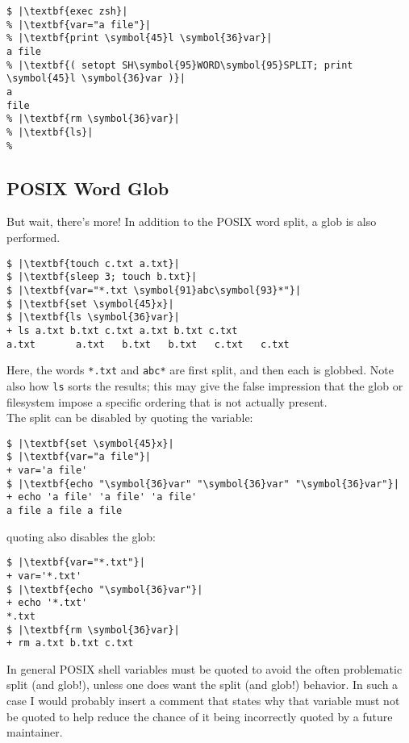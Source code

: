 \documentclass[10pt,a4paper]{article}
\begin{document}
\begin{lstlisting}
$ |\textbf{exec zsh}|
% |\textbf{var="a file"}|
% |\textbf{print \symbol{45}l \symbol{36}var}|
a file
% |\textbf{( setopt SH\symbol{95}WORD\symbol{95}SPLIT; print \symbol{45}l \symbol{36}var )}|
a
file
% |\textbf{rm \symbol{36}var}|
% |\textbf{ls}|
%
\end{lstlisting}

\subsection*{POSIX Word Glob}

But wait, there's more! In addition to the POSIX word split, a glob is
also performed.

\begin{lstlisting}
$ |\textbf{touch c.txt a.txt}|
$ |\textbf{sleep 3; touch b.txt}|
$ |\textbf{var="*.txt \symbol{91}abc\symbol{93}*"}|
$ |\textbf{set \symbol{45}x}|
$ |\textbf{ls \symbol{36}var}|
+ ls a.txt b.txt c.txt a.txt b.txt c.txt
a.txt       a.txt   b.txt   b.txt   c.txt   c.txt
\end{lstlisting}

Here, the words \texttt{*.txt} and \texttt{abc*}
are first split, and then each is globbed. Note also how \texttt{ls}
sorts the results; this may give the false impression that the glob or
filesystem impose a specific ordering that is not actually present. \\

The split can be disabled by quoting the variable:

\begin{lstlisting}
$ |\textbf{set \symbol{45}x}|
$ |\textbf{var="a file"}|
+ var='a file'
$ |\textbf{echo "\symbol{36}var" "\symbol{36}var" "\symbol{36}var"}|
+ echo 'a file' 'a file' 'a file'
a file a file a file
\end{lstlisting}

quoting also disables the glob:

\begin{lstlisting}
$ |\textbf{var="*.txt"}|
+ var='*.txt'
$ |\textbf{echo "\symbol{36}var"}|
+ echo '*.txt'
*.txt
$ |\textbf{rm \symbol{36}var}|
+ rm a.txt b.txt c.txt
\end{lstlisting}

In general POSIX shell variables must be quoted to avoid the often
problematic split (and glob!), unless one does want the split (and
glob!) behavior. In such a case I would probably insert a comment that
states why that variable must not be quoted to help reduce the chance of
it being incorrectly quoted by a future maintainer. \\
\end{document}
